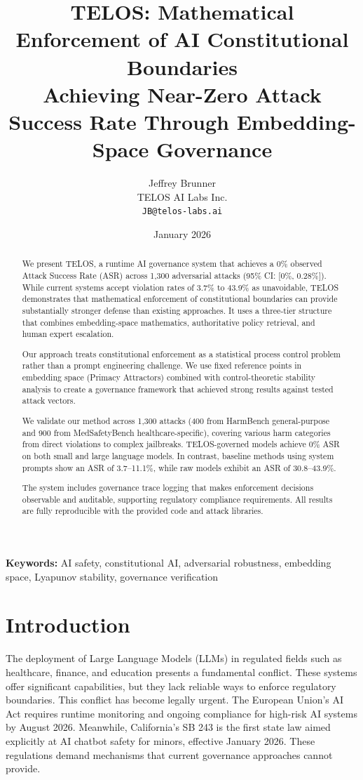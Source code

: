 \documentclass[11pt,a4paper]{article}
\title{TELOS: Mathematical Enforcement of AI Constitutional Boundaries\\
\large Achieving Near-Zero Attack Success Rate Through Embedding-Space Governance}
\author{
Jeffrey Brunner\\
TELOS AI Labs Inc.\\
\texttt{JB@telos-labs.ai}
}
\date{January 2026}
\begin{document}
\maketitle

\begin{abstract}
We present TELOS, a runtime AI governance system that achieves a 0\% observed Attack Success Rate (ASR) across 1,300 adversarial attacks (95\% CI: [0\%, 0.28\%]). While current systems accept violation rates of 3.7\% to 43.9\% as unavoidable, TELOS demonstrates that mathematical enforcement of constitutional boundaries can provide substantially stronger defense than existing approaches. It uses a three-tier structure that combines embedding-space mathematics, authoritative policy retrieval, and human expert escalation.

Our approach treats constitutional enforcement as a statistical process control problem rather than a prompt engineering challenge. We use fixed reference points in embedding space (Primacy Attractors) combined with control-theoretic stability analysis to create a governance framework that achieved strong results against tested attack vectors.

We validate our method across 1,300 attacks (400 from HarmBench general-purpose and 900 from MedSafetyBench healthcare-specific), covering various harm categories from direct violations to complex jailbreaks. TELOS-governed models achieve 0\% ASR on both small and large language models. In contrast, baseline methods using system prompts show an ASR of 3.7--11.1\%, while raw models exhibit an ASR of 30.8--43.9\%.

The system includes governance trace logging that makes enforcement decisions observable and auditable, supporting regulatory compliance requirements. All results are fully reproducible with the provided code and attack libraries.
\end{abstract}

\textbf{Keywords:} AI safety, constitutional AI, adversarial robustness, embedding space, Lyapunov stability, governance verification

\section{Introduction}

The deployment of Large Language Models (LLMs) in regulated fields such as healthcare, finance, and education presents a fundamental conflict. These systems offer significant capabilities, but they lack reliable ways to enforce regulatory boundaries. This conflict has become legally urgent. The European Union's AI Act requires runtime monitoring and ongoing compliance for high-risk AI systems by August 2026. Meanwhile, California's SB 243 is the first state law aimed explicitly at AI chatbot safety for minors, effective January 2026. These regulations demand mechanisms that current governance approaches cannot provide.
\end{document}
